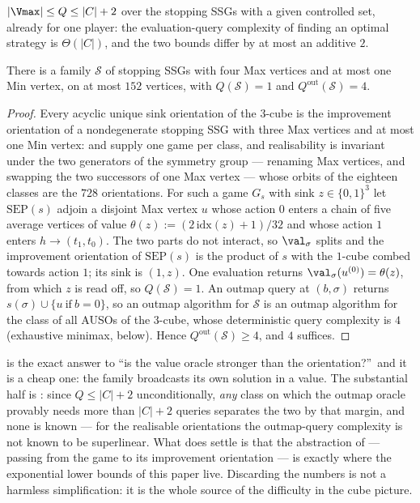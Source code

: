 \begin{corollary}\label{cor:qm-theta}
$|\Vmax|\le Q\le|C|+2$ over the stopping SSGs with a given controlled set,
already for one player: the evaluation-query complexity of finding an
optimal strategy is $\Theta(|C|)$, and the two bounds differ by at most an
additive $2$.
\end{corollary}

\begin{proposition}\label{prop:qm-separation}
There is a family $\mathcal S$ of stopping SSGs with four Max vertices and
at most one Min vertex, on at most $152$ vertices, with
$Q(\mathcal S)=1$ and $Q^{\mathrm{out}}(\mathcal S)=4$.
\end{proposition}

\begin{proof}
Every acyclic unique sink orientation of the $3$-cube is the improvement
orientation of a nondegenerate stopping SSG with three Max vertices and at
most one Min vertex:  and 
supply one game per class, and realisability is invariant under the two
generators of the symmetry group --- renaming Max vertices, and swapping
the two successors of one Max vertex --- whose orbits of the eighteen
classes are the $728$ orientations.  For such a game $G_s$ with sink
$z\in\{0,1\}^{3}$ let $\mathrm{SEP}(s)$ adjoin a disjoint Max vertex $u$
whose action $0$ enters a chain of five average vertices of value
$\theta(z):=(2\,\mathrm{idx}(z)+1)/32$ and whose action $1$ enters
$h\to(t_1,t_0)$.  The two parts do not interact, so
$\val_\sigma$ splits and the improvement orientation of $\mathrm{SEP}(s)$
is the product of $s$ with the $1$-cube combed towards action $1$; its
sink is $(1,z)$.  One evaluation returns $\val_\sigma(u^{(0)})=\theta(z)$,
from which $z$ is read off, so $Q(\mathcal S)=1$.  An outmap query at
$(b,\sigma)$ returns $s(\sigma)\cup\{u\ \text{if}\ b=0\}$, so an outmap
algorithm for $\mathcal S$ is an outmap algorithm for the class of all
AUSOs of the $3$-cube, whose deterministic query complexity is $4$
(exhaustive minimax, below).  Hence $Q^{\mathrm{out}}(\mathcal S)\ge4$, and
$4$ suffices.
\end{proof}

\begin{remark}\label{rem:qm-separation}
 is the exact answer to ``is the value oracle
stronger than the orientation?''\ and it is a cheap one: the family
broadcasts its own solution in a value.  The substantial half is
: since $Q\le|C|+2$ unconditionally, \emph{any} class on
which the outmap oracle provably needs more than $|C|+2$ queries separates
the two by that margin, and none is known --- for the realisable
orientations the outmap-query complexity is not known to be superlinear.
What  does settle is that the abstraction of
 --- passing from the game to its improvement
orientation --- is exactly where the exponential lower bounds of this paper
live.  Discarding the numbers is not a harmless simplification: it is the
whole source of the difficulty in the cube picture.
\end{remark}